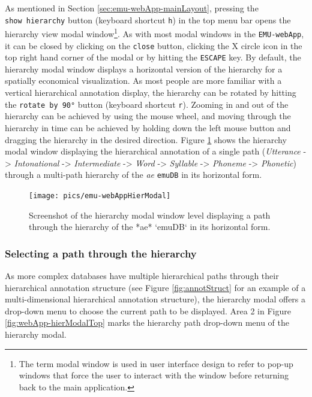 \documentclass[]{book}
\let\rmarkdownfootnote\footnote%
\def\footnote{\protect\rmarkdownfootnote}
\begin{document}
As mentioned in Section \ref{sec:emu-webApp-mainLayout}, pressing the \texttt{show\ hierarchy} button (keyboard shortcut \texttt{h}) in the top menu bar opens the hierarchy view modal window\footnote{The term modal window is used in user interface design to refer to pop-up windows that force the user to interact with the window before returning back to the main application.}. As with most modal windows in the \texttt{EMU-webApp}, it can be closed by clicking on the \texttt{close} button, clicking the X circle icon in the top right hand corner of the modal or by hitting the \texttt{ESCAPE} key. By default, the hierarchy modal window displays a horizontal version of the hierarchy for a spatially economical visualization. As most people are more familiar with a vertical hierarchical annotation display, the hierarchy can be rotated by hitting the \texttt{rotate\ by\ 90°} button (keyboard shortcut \texttt{r}). Zooming in and out of the hierarchy can be achieved by using the mouse wheel, and moving through the hierarchy in time can be achieved by holding down the left mouse button and dragging the hierarchy in the desired direction. Figure \ref{fig:webApp-hierModal} shows the hierarchy modal window displaying the hierarchical annotation of a single path (\emph{Utterance} -\textgreater{} \emph{Intonational} -\textgreater{} \emph{Intermediate} -\textgreater{} \emph{Word} -\textgreater{} \emph{Syllable} -\textgreater{} \emph{Phoneme} -\textgreater{} \emph{Phonetic}) through a multi-path hierarchy of the \emph{ae} \texttt{emuDB} in its horizontal form.

\begin{figure}

{\centering \texttt{[image: pics/emu-webAppHierModal]} 

}

\caption{Screenshot of the hierarchy modal window level displaying a path through the hierarchy of the *ae* `emuDB` in its horizontal form.}\label{fig:webApp-hierModal}
\end{figure}

\hypertarget{selecting-a-path-through-the-hierarchy}{%
\subsubsection{Selecting a path through the hierarchy}\label{selecting-a-path-through-the-hierarchy}}

As more complex databases have multiple hierarchical paths through their hierarchical annotation structure (see Figure \ref{fig:annotStruct} for an example of a multi-dimensional hierarchical annotation structure), the hierarchy modal offers a drop-down menu to choose the current path to be displayed. Area 2 in Figure \ref{fig:webApp-hierModalTop} marks the hierarchy path drop-down menu of the hierarchy modal.
\end{document}
